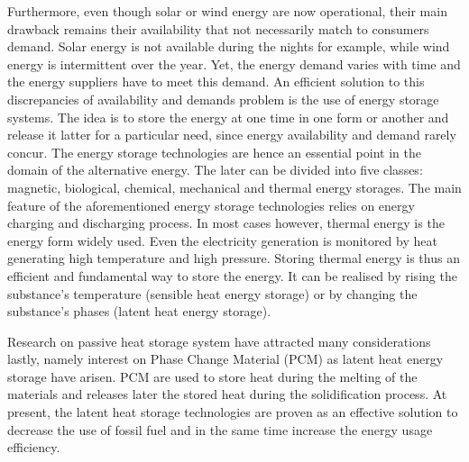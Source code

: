 Furthermore, even though solar or wind energy are now operational, their main drawback remains their availability that not necessarily match to consumers demand.
Solar energy is not available during the nights for example, while wind energy is intermittent over the year.
Yet, the energy demand varies with time and the energy suppliers have to meet this demand.
An efficient solution to this discrepancies of availability and demands problem is the use of energy storage systems.
The idea is to store the energy at one time in one form or another and release it latter for a particular need, since energy availability and demand rarely concur.
The energy storage technologies are hence an essential point in the domain of the alternative energy.
The later can be divided into five classes:
magnetic, biological, chemical, mechanical and thermal energy storages.
The main feature of the aforementioned energy storage technologies relies on energy charging and discharging process.
In most cases however, thermal energy is the energy form widely used.
Even the electricity generation is monitored by heat generating high temperature and high pressure.
Storing thermal energy is thus an efficient and fundamental way to store the energy.
It can be realised by rising the substance's temperature (sensible heat energy storage) or by changing the substance's phases (latent heat energy storage).

Research on passive heat storage system have attracted many considerations lastly, namely interest on Phase Change Material (PCM) as latent heat energy storage have arisen.
PCM are used to store heat during the melting of the materials and releases later the stored heat during the solidification process.
At present, the latent heat storage technologies are proven as an effective solution to decrease the use of fossil fuel and in the same time increase the energy usage efficiency.

